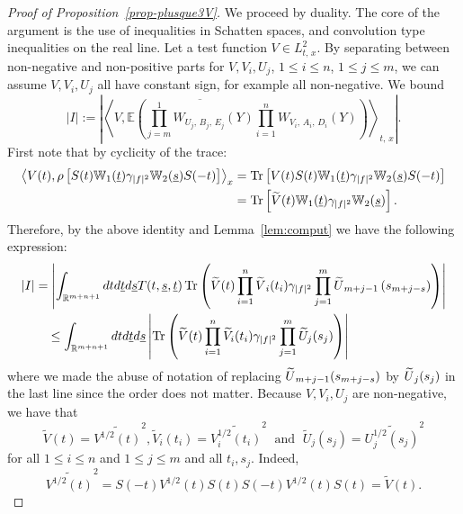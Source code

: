 \documentclass[AHL, Unicode, longabstracts,published]{cedram}
\newcommand{\R}{\mathbb{R}}
\newcommand{\E}{\mathbb{E}}
\newcommand{\bbW}{\mathbb{W}}
\DeclareMathOperator{\Tr}{Tr}
\let\oldtilde\tilde
\renewcommand*{\tilde}[1]{\mathchoice{\widetilde{#1}}{\widetilde{#1}}{\oldtilde{#1}}{\oldtilde{#1}}}
\begin{document}
\begin{proof}[Proof of Proposition~\ref{prop-plusque3V}]
We proceed by duality. The core of the argument is the use of inequalities in Schatten spaces, and convolution type inequalities on the real line. Let a test function $V \in L^2_{t,\,x}$. By separating between non-negative and non-positive parts for $V,V_i, U_j$, $1\leq i\leq n$, $1\leq j\leq m$, we can assume $V,V_i,U_j$ all have constant sign, for example all non-negative. We bound
\[
|I| := \left|\left\langle V,\E \left(\overline{ \prod_{j=m}^1 W_{U_j,\,B_j,\,E_j} (Y)} \prod_{i=1}^n W_{V_i,\,A_i,\,D_i}(Y)\right) \right\rangle_{t,\,x}\right|.
\]
First note that by cyclicity of the trace:
\begin{align*}
\left\langle V(t),\rho \left[S(t) \bbW_1(\underline t) \gamma_{|f|^2} \bbW_2(\underline s)S(-t) \right]\right\rangle_x&=\Tr\left[V(t)S(t) \bbW_1(\underline t) \gamma_{|f|^2} \bbW_2(\underline s)S(-t) \right] \\
&=\Tr \left[\tilde V(t) \bbW_1(\underline t) \gamma_{|f|^2} \bbW_2(\underline s) \right].
\end{align*}
Therefore, by the above identity and Lemma~\ref{lem:comput} we have the following expression:
\begin{align*}
|I| &= \left|\int_{\R^{m+n+1}} dt d\underline t d\underline s T(t,\underline s, \underline t) \Tr\left(\tilde V(t) \prod_{i=1}^n \tilde V_i(t_i) \gamma_{|f|^2} \prod_{j=1}^m \tilde U_{m+j-1}\left(s_{m+j-s}\right)\right)\right|\\
&\quad \leq \int_{\R^{m+n+1}} dtd\underline t d\underline s \left| \Tr\left(\widetilde V(t) \prod_{i=1}^n \widetilde V_i(t_i) \gamma_{|f|^2} \prod_{j=1}^m \widetilde U_j(s_j)\right)\right|
\end{align*}
where we made the abuse of notation of replacing $\tilde U_{m+j-1}(s_{m+j-s})$ by $\tilde U_{j}(s_{j})$ in the last line since the order does not matter. Because $V,V_i,U_j$ are non-negative, we have that
\[
\widetilde V (t)= \widetilde{V^{1/2}(t)}^2, \widetilde V_i (t_i) = \widetilde{V^{1/2}_i(t_i)}^2\; \text{ and }\;\widetilde U_j(s_j) = \widetilde{U_j^{1/2}(s_j)}^2
\]
for all $1\leq i\leq n$ and $1\leq j\leq m$ and all $t_i,s_j$. Indeed,
\[
\widetilde{V^{1/2}(t)}^2 = S(-t) V^{1/2}(t) S(t) S(-t) V^{1/2} (t)S(t) = \widetilde V(t).
\]


\end{proof}
\end{document}
